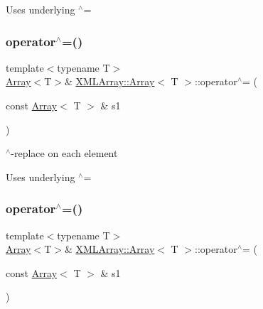 Uses underlying $^\wedge$= \mbox{\label{classXMLArray_1_1Array_a8e2621caf3277b85e6898a3eceb9b233}} 
\subsubsection{\texorpdfstring{operator$^\wedge$=()}{operator^=()}\hspace{0.1cm}{\footnotesize\ttfamily [2/6]}}
{\footnotesize\ttfamily template$<$typename T$>$ \\
\mbox{\hyperlink{classXMLArray_1_1Array}{Array}}$<$T$>$\& \mbox{\hyperlink{classXMLArray_1_1Array}{X\+M\+L\+Array\+::\+Array}}$<$ T $>$\+::operator$^\wedge$= (\begin{DoxyParamCaption}\item[{const \mbox{\hyperlink{classXMLArray_1_1Array}{Array}}$<$ T $>$ \&}]{s1 }\end{DoxyParamCaption})\hspace{0.3cm}{\ttfamily [inline]}}



$^\wedge$-\/replace on each element 

Uses underlying $^\wedge$= \mbox{\label{classXMLArray_1_1Array_a8e2621caf3277b85e6898a3eceb9b233}} 
\subsubsection{\texorpdfstring{operator$^\wedge$=()}{operator^=()}\hspace{0.1cm}{\footnotesize\ttfamily [3/6]}}
{\footnotesize\ttfamily template$<$typename T$>$ \\
\mbox{\hyperlink{classXMLArray_1_1Array}{Array}}$<$T$>$\& \mbox{\hyperlink{classXMLArray_1_1Array}{X\+M\+L\+Array\+::\+Array}}$<$ T $>$\+::operator$^\wedge$= (\begin{DoxyParamCaption}\item[{const \mbox{\hyperlink{classXMLArray_1_1Array}{Array}}$<$ T $>$ \&}]{s1 }\end{DoxyParamCaption})\hspace{0.3cm}{\ttfamily [inline]}}



